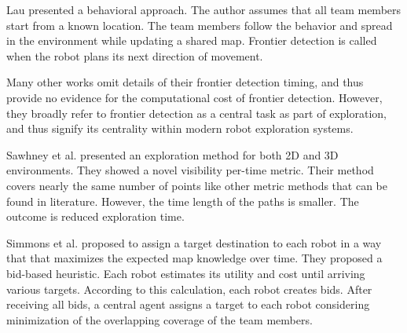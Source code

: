 


Lau \cite{lau_behavioural_2003} presented a behavioral approach.
The author assumes that all team members start from a known
location. The team members follow the behavior and spread in the
environment while updating a shared map. Frontier detection is called when
the robot plans its next direction of movement.


Many other works omit details of their frontier detection timing, and thus
provide no evidence for the computational cost of frontier detection. However,
they broadly refer to frontier detection as a central task as part of
exploration, and thus signify its centrality within modern robot exploration
systems.

Sawhney et al. \cite{sawhney_fast_2009} presented an exploration method for both
2D and 3D environments. They showed a  novel visibility per-time metric. Their
method covers nearly the same number of points like other metric methods that
can be found in literature.
However, the time length of the paths is smaller. The outcome is reduced
exploration time. 

Simmons et al. \cite{simmons_coordination_2000} proposed to assign a %
target destination to each robot in a way that that maximizes the expected
map knowledge over time.
They proposed a bid-based heuristic. Each robot estimates
its utility and cost until arriving various targets. According to this
calculation, each robot creates bids. After receiving all bids, a central
agent assigns a target to each robot considering minimization of the overlapping
coverage of the team members.

